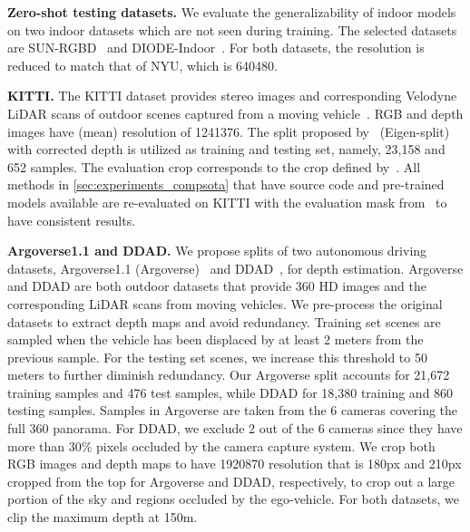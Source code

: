\noindent{}\textbf{Zero-shot testing datasets.} We evaluate the generalizability of indoor models on two indoor datasets which are not seen during training. The selected datasets are SUN-RGBD~\cite{Song2015} and DIODE-Indoor~\cite{Vasiljevic2019}. For both datasets, the resolution is reduced to match that of NYU, which is 640480.

\noindent{}\textbf{KITTI.} The KITTI dataset provides stereo images and corresponding Velodyne LiDAR scans of outdoor scenes captured from a moving vehicle~\cite{Geiger2012}. RGB and depth images have (mean) resolution of 1241376. The split proposed by~\cite{Eigen2014} (Eigen-split) with corrected depth is utilized as training and testing set, namely, 23,158 and 652 samples. The evaluation crop corresponds to the crop defined by~\cite{Garg2016}. All methods in \cref{sec:experiments_compsota} that have source code and pre-trained models available are re-evaluated on KITTI with the evaluation mask from~\cite{Garg2016} to have consistent results.

\noindent{}\textbf{Argoverse1.1 and DDAD.} We propose splits of two autonomous driving datasets, Argoverse1.1 (Argoverse)~\cite{Chang2019} and DDAD~\cite{Guizilini2020}, for depth estimation. Argoverse and DDAD are both outdoor datasets that provide 360 HD images and the corresponding LiDAR scans from moving vehicles. We pre-process the original datasets to extract depth maps and avoid redundancy. Training set scenes are sampled when the vehicle has been displaced by at least 2 meters from the previous sample. For the testing set scenes, we increase this threshold to 50 meters to further diminish redundancy. Our Argoverse split accounts for 21,672 training samples and 476 test samples, while DDAD for 18,380 training and 860 testing samples. Samples in Argoverse are taken from the 6 cameras covering the full 360 panorama. For DDAD, we exclude 2 out of the 6 cameras since they have more than 30\% pixels occluded by the camera capture system. 
We crop both RGB images and depth maps to have 1920870 resolution that is 180px and 210px cropped from the top for Argoverse and DDAD, respectively, to crop out a large portion of the sky and regions occluded by the ego-vehicle. For both datasets, we clip the maximum depth at 150m. 


